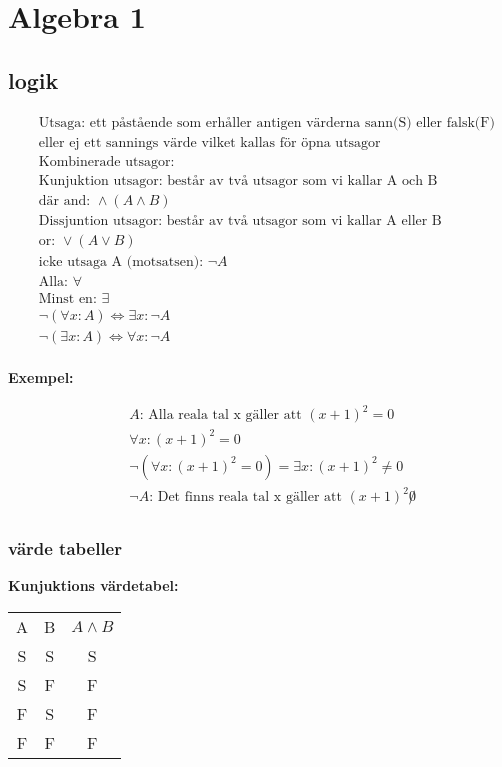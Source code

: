 \chapter{Algebra 1}

\newpage


\section{logik}
\begin{align*}
  &\quad \text{Utsaga: ett påstående som erhåller antigen värderna sann(S) eller falsk(F) vilket ge en stluten utsaga} \\
  &\quad \text{eller ej ett sannings värde vilket kallas för öpna utsagor} \\
  &\quad \text{Kombinerade utsagor:} \\
  &\quad \text{Kunjuktion utsagor: består av två utsagor som vi kallar A och B} \\
  &\quad \text{där and: } \land  (A \land B) \\
  &\quad \text{Dissjuntion utsagor: består av två utsagor som vi kallar A eller B} \\
  &\quad \text{or: } \lor  (A \lor B) \\
  &\quad \text{icke utsaga A (motsatsen): } \neg A \\
  &\quad \text{Alla: } \forall \\
  &\quad \text{Minst en: } \exists \\
  &\quad \neg(\forall x : A) \Leftrightarrow \exists x : \neg A \\
  &\quad \neg(\exists x : A) \Leftrightarrow \forall x : \neg A \\
\end{align*}

\textbf{Exempel:}\par
\begin{align*}
  &\quad A \text{: Alla reala tal x gäller att } (x+1)^2 = 0 \\
  &\quad \forall x : (x+1)^2 = 0 \\
  &\quad \neg(\forall x : (x+1)^2 = 0) = \exists x : (x+1)^2 \not = 0 \\
  &\quad \neg A \text{: Det finns reala tal x gäller att } (x+1)^2 \not 0 \\
\end{align*}



\subsection{värde tabeller}
\textbf{Kunjuktions värdetabel:}\par
\begin{center}
\begin{tabular}{ |c|c|c| } 
 \hline
 A  & B  & \(A \land B\) \\ 
 S  & S  & S          \\ 
 S  & F  & F          \\  
 F  & S  & F          \\ 
 F  & F  & F          \\ 
 \hline
\end{tabular}
\end{center}

